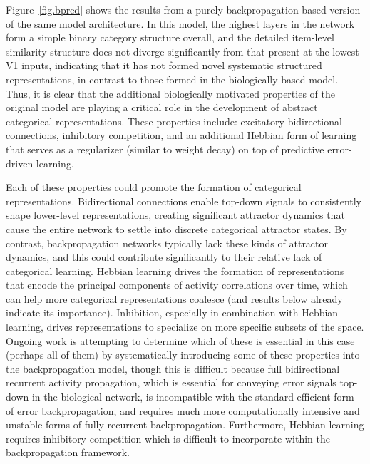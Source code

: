 \documentclass[12pt,twoside]{naturefigs}  %
\newif\myifpdf
\begin{document}
Figure~\ref{fig.bpred} shows the results from a purely backpropagation-based version of the same model architecture.  In this model, the highest layers in the network form a simple binary category structure overall, and the detailed item-level similarity structure does not diverge significantly from that present at the lowest V1 inputs, indicating that it has not formed novel systematic structured representations, in contrast to those formed in the biologically based model.  Thus, it is clear that the additional biologically motivated properties of the original model are playing a critical role in the development of abstract categorical representations. These properties include: excitatory bidirectional connections, inhibitory competition, and an additional Hebbian form of learning that serves as a regularizer (similar to weight decay) on top of predictive error-driven learning\cite{OReilly98,OReillyMunakata00}.


Each of these properties could promote the formation of categorical representations. Bidirectional connections enable top-down signals to consistently shape lower-level representations, creating significant attractor dynamics that cause the entire network to settle into discrete categorical attractor states. By contrast, backpropagation networks typically lack these kinds of attractor dynamics, and this could contribute significantly to their relative lack of categorical learning.  Hebbian learning drives the formation of representations that encode the principal components of activity correlations over time, which can help more categorical representations coalesce (and results below already indicate its importance).  Inhibition, especially in combination with Hebbian learning, drives representations to specialize on more specific subsets of the space.  Ongoing work is attempting to determine which of these is essential in this case (perhaps all of them) by systematically introducing some of these properties into the backpropagation model, though this is difficult because full bidirectional recurrent activity propagation, which is essential for conveying error signals top-down in the biological network, is incompatible with the standard efficient form of error backpropagation, and requires much more computationally intensive and unstable forms of fully recurrent backpropagation\cite{WilliamsZipser92,Pineda87}.  Furthermore, Hebbian learning requires inhibitory competition which is difficult to incorporate within the backpropagation framework.
\end{document}
